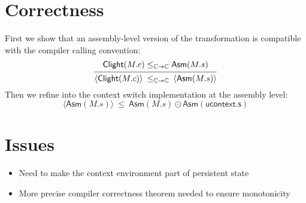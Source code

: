\documentclass{article}
\newcommand\kw[1]{\mathsf{#1}}
\begin{document}
\section{Correctness}

First we show that an assembly-level version of the transformation
is compatible with the compiler calling convention:
\[
  \begin{prooftree}
    \hypo{\kw{Clight}(M.c) \le_{\mathbb{C} \twoheadrightarrow \mathbb{C}} \kw{Asm}(M.s)}
    \infer1{
      \langle \kw{Clight}(M.c) \rangle \:\le_{\mathbb{C} \twoheadrightarrow \mathbb{C}}\:
      \langle \kw{Asm}(M.s) \rangle
    }
  \end{prooftree}
\]
Then we refine into the context switch implementation at the assembly level:
\[
  \langle \kw{Asm}(M.s) \rangle
  \:\le\:
  \kw{Asm}(M.s) \odot \kw{Asm}(\kw{ucontext.s})
\]

\section{Issues}

\begin{itemize}
  \item Need to make the context environment part of persistent state
  \item More precise compiler correctness theorem needed to ensure monotonicity
\end{itemize}
\end{document}
